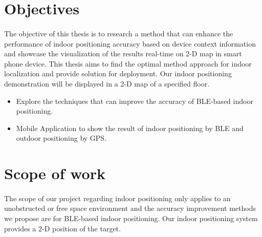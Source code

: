 \section{Objectives}
\paragraph{}The objective of this thesis is to research a method that can enhance the performance of indoor positioning accuracy based on device context information and showcase the visualization of the results real-time on 2-D map in smart phone device. This thesis aims to find the optimal method approach for indoor localization and provide solution for deployment. Our indoor positioning demonstration will be displayed in a 2-D map of a specified floor.
    \begin{itemize}
    	\item Explore the techniques that can improve the accuracy of BLE-based indoor positioning.
    	\item Mobile Application to show the result of indoor positioning by BLE and outdoor positioning by GPS.
    \end{itemize}


\section{Scope of work}
\paragraph{} The scope of our project regarding indoor positioning only applies to an unobstructed or free space environment and the accuracy improvement methods we propose are for BLE-based indoor positioning. Our indoor positioning  system provides a 2-D position of the target.


        	        	 

